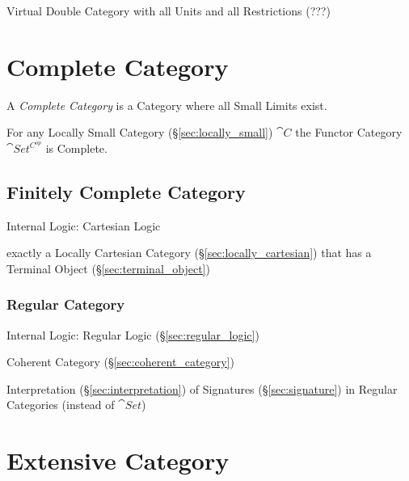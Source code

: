 Virtual Double Category with all Units and all Restrictions (???)



\section{Complete Category}\label{sec:complete_category}

A \emph{Complete Category} is a Category where all Small Limits exist.

For any Locally Small Category (\S\ref{sec:locally_small})
$\cat{C}$ the Functor Category $\cat{Set^{C^{op}}}$ is Complete.



\subsection{Finitely Complete Category}\label{sec:finitely_complete}

Internal Logic: Cartesian Logic %

exactly a Locally Cartesian Category (\S\ref{sec:locally_cartesian})
that has a Terminal Object (\S\ref{sec:terminal_object})



\subsubsection{Regular Category}\label{sec:regular_category}

Internal Logic: Regular Logic (\S\ref{sec:regular_logic})

Coherent Category (\S\ref{sec:coherent_category})

Interpretation (\S\ref{sec:interpretation}) of Signatures
(\S\ref{sec:signature}) in Regular Categories (instead of $\cat{Set}$)



\section{Extensive Category}\label{sec:extensive_category}


